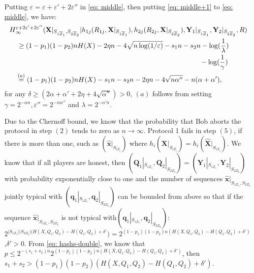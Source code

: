 \documentclass[runningheads]{llncs}
\newcommand{\parbreak}{ \vspace{0.3 em}}
\newcounter{protocol}
\begin{document}
\parbreak Putting $\varepsilon = \varepsilon + \varepsilon'+2\varepsilon''$ in \eqref{eq: middle}, then putting \eqref{eq: middle+1} to \eqref{eq: middle}, we have: 
\begin{align}
    H&^{\varepsilon+2\varepsilon'+2\varepsilon''}_{\infty}(\mathbf{X}|_{S_{1\overline{Z}_1},S_{2\overline{Z}_2}}| h_{1j}(R_{1j},\mathbf{X}|_{S_{1\overline{Z}_1}}),   h_{2j}(R_{2j},\mathbf{X}|_{S_{2\overline{Z}_2}}),\mathbf{Y}_1|_{S_{1\overline{Z}_1}},\mathbf{Y}_2|_{S_{2\overline{Z}_2}}, R)\notag\\
    &\,\geq (1-p_1)(1-p_2)n H(X)-2\eta n-4\sqrt{n\log(1/\varepsilon)}-s_1 n - s_2 n - \log(\frac{1}{\lambda})\notag\\
    & \qquad\qquad\qquad\qquad\qquad\qquad\qquad\qquad\qquad\qquad\qquad\qquad\qquad\,\,\,\,\,- \log(\frac{1}{\gamma})\notag\\
    & \overset{(a)}{=} (1-p_1)(1-p_2)n H(X) - s_1 n -s_2 n -2\eta n-4\sqrt{n\alpha''}-n (\alpha+\alpha'),
\end{align}
for any $\delta \geq (2\alpha + \alpha'+ 2\eta +4\sqrt{\alpha''})> 0$,  $(a)$ follows from setting $\gamma = 2^{-\alpha n}, \varepsilon'' = 2^{-n\alpha''}$ and  $\lambda = 2^{-\alpha' n}$.

\parbreak Due to the Chernoff bound, we know that the probability that Bob aborts the protocol in step $(2)$ tends to zero as $n\rightarrow \infty$. Protocol 1 fails in step $(5)$, if there is more than one, such as $(\hat{\mathbf{x}}|_{S_{iZ_i}})$ where $h_i(\mathbf{X}|_{S_{iZ_i}}) = h_i(\hat{\mathbf{X}}|_{S_{iZ_i}})$. We know that if all players are honest, then $(\mathbf{Q}_1|_{S_{1Z_1}},\mathbf{Q}_2|_{S_{2Z_2}}) =( \mathbf{Y}_1|_{S_{1Z_1}},\mathbf{Y}_2|_{S_{2Z_2}})$ with probability exponentially close to one and the number of sequences $\hat{\mathbf{x}}|_{S_{1Z_1},S_{2Z_2}}$ jointly typical with $(\mathbf{q}_1|_{S_{1Z_1}},\mathbf{q}_2|_{S_{2Z_2}})$ can be bounded from above so that if the sequence $\hat{\mathbf{x}}|_{S_{1Z_1},S_{2Z_2}}$ is not typical with$(\mathbf{q}_1|_{S_{1Z_1}},\mathbf{q}_2|_{S_{2Z_2}})$:\linebreak  $2^{\lvert S_{1Z_1} \rvert\lvert S_{2Z_2} \rvert(H(X,Q_1,Q_2)- H(Q_1,Q_2)+ \delta'}) =  2^{(1-p_1)(1-p_2)n(H(X,Q_1,Q_2)- H(Q_1,Q_2)+ \delta')}$,\linebreak $\delta'>0$. From \eqref{eq: hashs-double}, we know that\linebreak $p\leq 2^{-(s_1+s_2)n}2^{(1-p_1)(1-p_2)n(H(X,Q_1,Q_2)- H(Q_1,Q_2)+ \delta')}$, then $s_1+s_2 > (1-p_1)(1-p_2) (H(X,Q_1,Q_2)- H(Q_1,Q_2)+ \delta')$.
\end{document}
